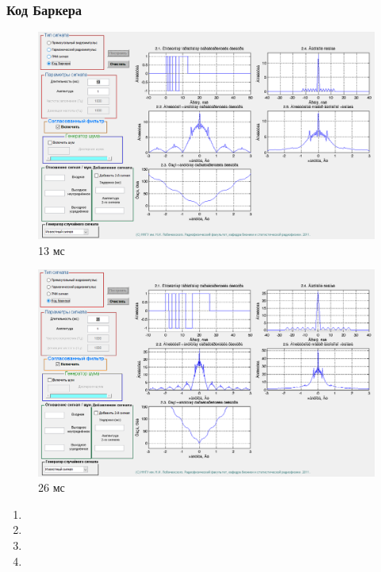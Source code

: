 \subsubsection{Код Баркера}
\begin{figure}[H]
    \centering
    \includegraphics[width=0.9\linewidth]{imgs/task_2/t2s4_13.png}
    \caption{13 мс}
    \label{fig:task_2_4_13}
\end{figure}
\begin{figure}[H]
    \centering
    \includegraphics[width=0.9\linewidth]{imgs/task_2/t2s4_26.png}
    \caption{26 мс}
    \label{fig:task_2_4_26}
\end{figure}

\begin{enumerate}
    \item 
    \item 
    \item 
    \item 
\end{enumerate}